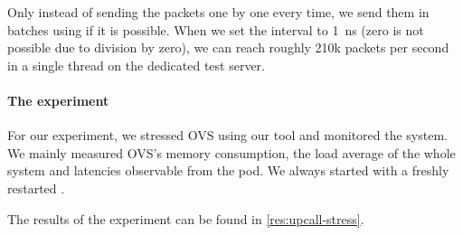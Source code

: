 Only instead of sending the packets one by one every time, we send them in batches using  if it is possible. When we set the interval to \qty{1}{\ns} (zero is not possible due to division by zero), we can reach roughly 210k packets per second in a single thread on the dedicated test server.

\paragraph{The experiment}
For our experiment, we stressed OVS using our tool and monitored the system. We mainly measured OVS's memory consumption, the load average of the whole system and latencies observable from the  pod. We always started with a freshly restarted .

The results of the experiment can be found in \cref{res:upcall-stress}.